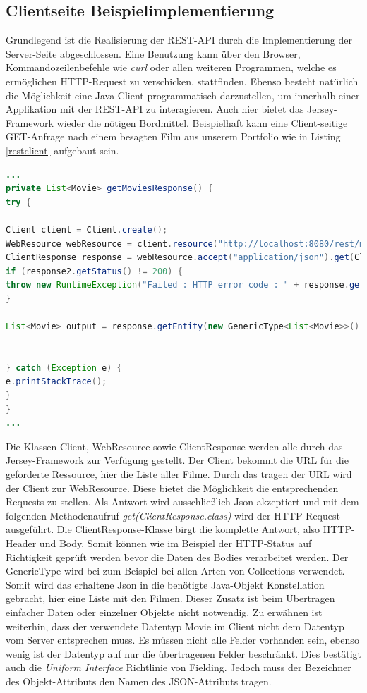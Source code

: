 \documentclass[fleqn,10.5pt,ngerman]{SelfArx}
\begin{document}
\subsection{Clientseite Beispielimplementierung}
Grundlegend ist die Realisierung der REST-API durch die Implementierung der Server-Seite abgeschlossen. Eine Benutzung kann über den Browser, Kommandozeilenbefehle wie \textit{curl} oder allen weiteren Programmen, welche es ermöglichen HTTP-Request zu verschicken, stattfinden. Ebenso besteht natürlich die Möglichkeit eine Java-Client programmatisch darzustellen, um innerhalb einer Applikation mit der REST-API zu interagieren. Auch hier bietet das Jersey-Framework wieder die nötigen Bordmittel. Beispielhaft kann eine Client-seitige GET-Anfrage nach einem besagten Film aus unserem Portfolio wie in Listing \ref{restclient} aufgebaut sein.
\begin{lstlisting}[caption=Beispiel: Beispielhafte Java-Client Anfrage, label=restclient, language=java, emptylines=0, flexiblecolumns=false]
...
private List<Movie> getMoviesResponse() {
try {

Client client = Client.create();
WebResource webResource = client.resource("http://localhost:8080/rest/movies");
ClientResponse response = webResource.accept("application/json").get(ClientResponse.class);
if (response2.getStatus() != 200) {
throw new RuntimeException("Failed : HTTP error code : " + response.getStatus());
}

List<Movie> output = response.getEntity(new GenericType<List<Movie>>(){});


} catch (Exception e) {
e.printStackTrace();
}
}
...
\end{lstlisting}
Die Klassen Client, WebResource sowie ClientResponse werden alle durch das Jersey-Framework zur Verfügung gestellt. Der Client bekommt die URL für die geforderte Ressource, hier die Liste aller Filme. Durch das tragen der URL wird der Client zur WebResource. Diese bietet die Möglichkeit die entsprechenden Requests zu stellen. Als Antwort wird ausschließlich Json akzeptiert und mit dem folgenden Methodenaufruf \textit{get(ClientResponse.class)} wird der HTTP-Request ausgeführt. Die ClientResponse-Klasse birgt die komplette Antwort, also HTTP-Header und Body. Somit können wie im Beispiel der HTTP-Status auf Richtigkeit geprüft werden bevor die Daten des Bodies verarbeitet werden. Der GenericType wird bei zum Beispiel bei allen Arten von Collections verwendet. Somit wird das erhaltene Json in die benötigte Java-Objekt Konstellation gebracht, hier eine Liste mit den Filmen. Dieser Zusatz ist beim Übertragen einfacher Daten oder einzelner Objekte nicht notwendig. Zu erwähnen ist weiterhin, dass der verwendete Datentyp Movie im Client nicht dem Datentyp vom Server entsprechen muss. Es müssen nicht alle Felder vorhanden sein, ebenso wenig ist der Datentyp auf nur die übertragenen Felder beschränkt. Dies bestätigt auch die \textit{Uniform Interface} Richtlinie von Fielding. Jedoch muss der Bezeichner des Objekt-Attributs den Namen des JSON-Attributs tragen.
\end{document}
